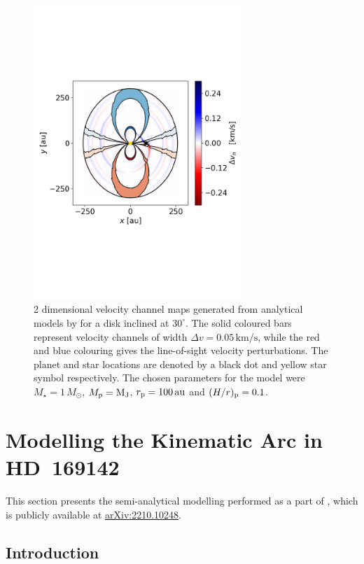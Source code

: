 \begin{figure}%
    \centering
    \includegraphics[width = 0.7\textwidth]{figures/bollati_2d_kinks.pdf}
    \caption{2 dimensional velocity channel maps generated from analytical models by \citet{bollati2021} for a disk inclined at $30^\circ$. The solid coloured bars represent velocity channels of width $\Delta v = 0.05 \, \mathrm{km/s}$, while the red and blue colouring gives the line-of-sight velocity perturbations. The planet and star locations are denoted by a black dot and yellow star symbol respectively. The chosen parameters for the model were $M_\star = 1\, M_\odot$, $M_{\rm p}=\mathrm{M_J}$, $r_{\rm p} = 100\, \mathrm{au}$ and $(H/r)_{\rm p}=0.1$.}
    \label{fig:2D_kinks}
\end{figure}

\section{Modelling the Kinematic Arc in HD~169142} \label{sec:hd169}

This section presents the semi-analytical modelling performed as a part of \citet{garg2022}, which is publicly available at \href{https://arxiv.org/abs/2207.02869}{arXiv:2210.10248}.

\subsection{Introduction}

